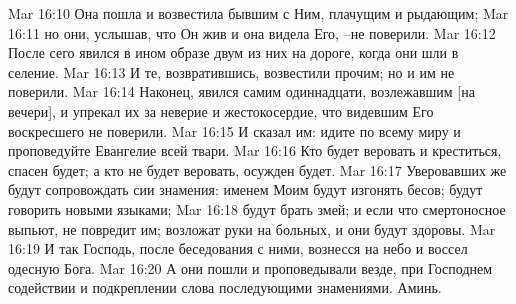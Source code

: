 Mar 16:10  Она пошла и возвестила бывшим с Ним, плачущим и рыдающим;
Mar 16:11  но они, услышав, что Он жив и она видела Его, --не поверили.
Mar 16:12  После сего явился в ином образе двум из них на дороге, когда они шли в селение.
Mar 16:13  И те, возвратившись, возвестили прочим; но и им не поверили.
Mar 16:14  Наконец, явился самим одиннадцати, возлежавшим [на вечери], и упрекал их за неверие и жестокосердие, что видевшим Его воскресшего не поверили.
Mar 16:15  И сказал им: идите по всему миру и проповедуйте Евангелие всей твари.
Mar 16:16  Кто будет веровать и креститься, спасен будет; а кто не будет веровать, осужден будет.
Mar 16:17  Уверовавших же будут сопровождать сии знамения: именем Моим будут изгонять бесов; будут говорить новыми языками;
Mar 16:18  будут брать змей; и если что смертоносное выпьют, не повредит им; возложат руки на больных, и они будут здоровы.
Mar 16:19  И так Господь, после беседования с ними, вознесся на небо и воссел одесную Бога.
Mar 16:20  А они пошли и проповедывали везде, при Господнем содействии и подкреплении слова последующими знамениями. Аминь.


